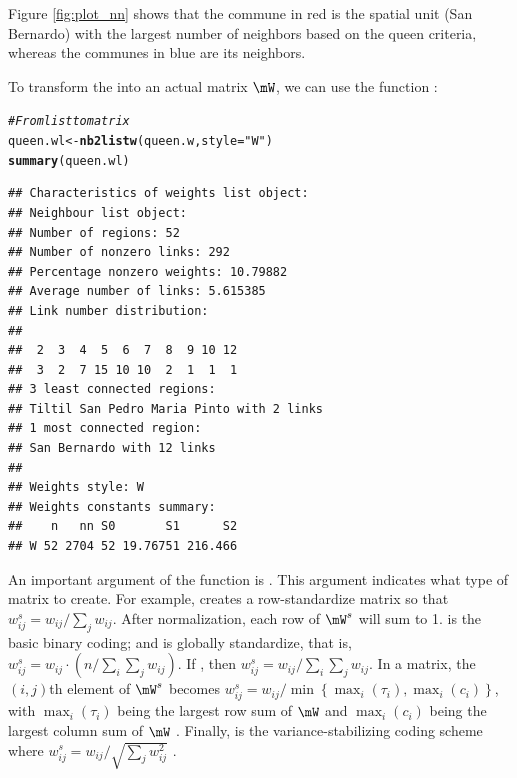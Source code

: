 \documentclass[english,12pt]{book}\usepackage[]{graphicx}\usepackage[]{xcolor}
\makeatletter
\newcommand{\hlstr}[1]{\textcolor[rgb]{0.192,0.494,0.8}{#1}}%
\newcommand{\hlcom}[1]{\textcolor[rgb]{0.678,0.584,0.686}{\textit{#1}}}%
\newcommand{\hlstd}[1]{\textcolor[rgb]{0.345,0.345,0.345}{#1}}%
\newcommand{\hlkwb}[1]{\textcolor[rgb]{0.69,0.353,0.396}{#1}}%
\newcommand{\hlkwc}[1]{\textcolor[rgb]{0.333,0.667,0.333}{#1}}%
\newcommand{\hlkwd}[1]{\textcolor[rgb]{0.737,0.353,0.396}{\textbf{#1}}}%
\newenvironment{kframe}{%
 \def\at@end@of@kframe{}%
 \ifinner\ifhmode%
  \def\at@end@of@kframe{\end{minipage}}%
  \begin{minipage}{\columnwidth}%
 \fi\fi%
 \def\FrameCommand##1{\hskip\@totalleftmargin \hskip-\fboxsep
 \colorbox{shadecolor}{##1}\hskip-\fboxsep
     \hskip-\linewidth \hskip-\@totalleftmargin \hskip\columnwidth}%
 \MakeFramed {\advance\hsize-\width
   \@totalleftmargin\z@ \linewidth\hsize
   \@setminipage}}%
 {\par\unskip\endMakeFramed%
 \at@end@of@kframe}
\newenvironment{knitrout}{}{} %
\makeatother
\begin{document}
Figure \ref{fig:plot_nn} shows that the commune in red is the spatial unit (San Bernardo) with the largest number of neighbors based on the queen criteria, whereas the communes in blue are its neighbors. 

To transform the  into an actual matrix $\mW$, we can use the function :


\begin{knitrout}
\color{fgcolor}\begin{kframe}
\begin{alltt}
\hlcom{# From list to matrix}
\hlstd{queen.wl} \hlkwb{<-} \hlkwd{nb2listw}\hlstd{(queen.w,} \hlkwc{style} \hlstd{=} \hlstr{"W"}\hlstd{)}
\hlkwd{summary}\hlstd{(queen.wl)}
\end{alltt}
\begin{verbatim}
## Characteristics of weights list object:
## Neighbour list object:
## Number of regions: 52 
## Number of nonzero links: 292 
## Percentage nonzero weights: 10.79882 
## Average number of links: 5.615385 
## Link number distribution:
## 
##  2  3  4  5  6  7  8  9 10 12 
##  3  2  7 15 10 10  2  1  1  1 
## 3 least connected regions:
## Tiltil San Pedro Maria Pinto with 2 links
## 1 most connected region:
## San Bernardo with 12 links
## 
## Weights style: W 
## Weights constants summary:
##    n   nn S0       S1      S2
## W 52 2704 52 19.76751 216.466
\end{verbatim}
\end{kframe}
\end{knitrout}

An important argument of the function is . This argument indicates what type of matrix to create. For example,  creates a row-standardize matrix so that $w^s_{ij} = w_{ij}/ \sum_j w_{ij}$. After normalization, each row of $\mW^s$ will sum to 1.  is the basic binary coding; and  is globally standardize, that is, $w^s_{ij} = w_{ij} \cdot (n/ \sum_{i}\sum_j w_{ij})$. If , then $w^s_{ij} = w_{ij}/ \sum_i\sum_j w_{ij}$. In a  matrix, the $(i,j)$th element of $\mW^s$  becomes $w^s_{ij} = w_{ij} / \min\left\lbrace \max_i(\tau_i), \max_i(c_i)\right\rbrace$, with $\max_i(\tau_i)$ being the largest row sum of $\mW$ and $\max_i(c_i)$ being the largest column sum of $\mW$ \citep{kelejian2010specification}. Finally,  is the variance-stabilizing coding scheme where $w^s_{ij} = w_{ij}/ \sqrt{\sum_j w_{ij} ^2}$ \citep{tiefelsdorf1999variance}. 
\end{document}
